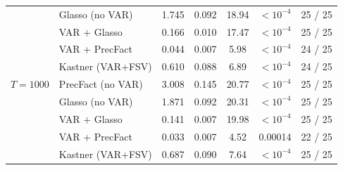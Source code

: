 \begin{table}[h!]
\begin{tabular}{llccccc}
           & Glasso (no VAR)    & 1.745 & 0.092 & 18.94 & $<10^{-4}$ & 25 / 25 \\
           & VAR + Glasso       & 0.166 & 0.010 & 17.47 & $<10^{-4}$ & 25 / 25 \\
           & VAR + PrecFact     & 0.044 & 0.007 &  5.98 & $<10^{-4}$ & 24 / 25 \\
           & Kastner (VAR+FSV)  & 0.610 & 0.088 &  6.89 & $<10^{-4}$ & 24 / 25 \\
\midrule
$T = 1000$ & PrecFact (no VAR)  & 3.008 & 0.145 & 20.77 & $<10^{-4}$ & 25 / 25 \\
           & Glasso (no VAR)    & 1.871 & 0.092 & 20.31 & $<10^{-4}$ & 25 / 25 \\
           & VAR + Glasso       & 0.141 & 0.007 & 19.98 & $<10^{-4}$ & 25 / 25 \\
           & VAR + PrecFact     & 0.033 & 0.007 &  4.52 & 0.00014 & 22 / 25 \\
           & Kastner (VAR+FSV)  & 0.687 & 0.090 &  7.64 & $<10^{-4}$ & 25 / 25 \\
\bottomrule
\end{tabular}
\end{table}

